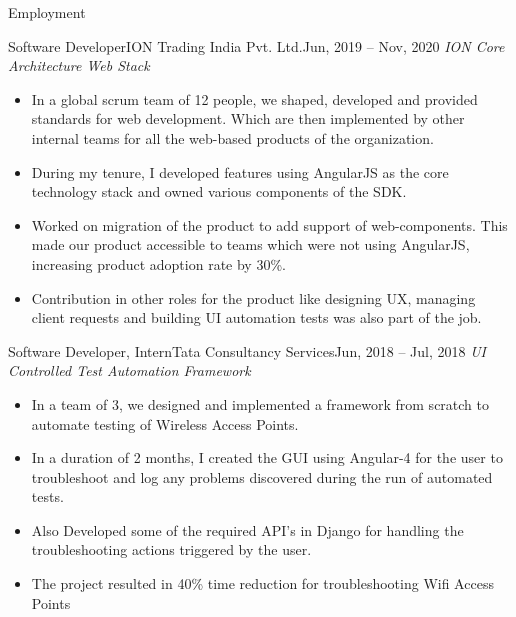 \documentclass[]{format}
\begin{document}
\begin{cvsection}{Employment}
		\begin{cvsubsection}{Software Developer}{ION Trading India Pvt. Ltd.}{Jun, 2019 – Nov, 2020}
			\textit{ION Core Architecture Web Stack}
			\begin{itemize}
				\item In a global scrum team of 12 people, we shaped, developed and provided standards for web development. Which are then implemented by other internal teams for all the web-based products of the organization.
				\item During my tenure, I developed features using AngularJS as the core technology stack and owned various components of the SDK.
				\item Worked on migration of the product to add support of web-components. This made our product accessible to teams which were not using AngularJS, increasing product adoption rate by 30\%.
				\item Contribution in other roles for the product like designing UX, managing client requests and building UI automation tests was also part of the job.
			\end{itemize}
		\end{cvsubsection}
		
		\begin{cvsubsection}{Software Developer, Intern}{Tata Consultancy Services}{Jun, 2018 – Jul, 2018}
		    \textit{UI Controlled Test Automation Framework}
			\begin{itemize}
				\item In a team of 3, we designed and implemented a framework from scratch to automate testing of Wireless Access Points.
				\item In a duration of 2 months, I created the GUI using Angular-4 for the user to troubleshoot and log any problems discovered during the run of automated tests.
				\item Also Developed some of the required API’s in Django for handling the troubleshooting actions triggered by the user.
				\item The project resulted in 40\% time reduction for troubleshooting Wifi Access Points
			\end{itemize}
		\end{cvsubsection}
		
	\end{cvsection}
	
	\vspace{-5pt}
	
\end{document}
